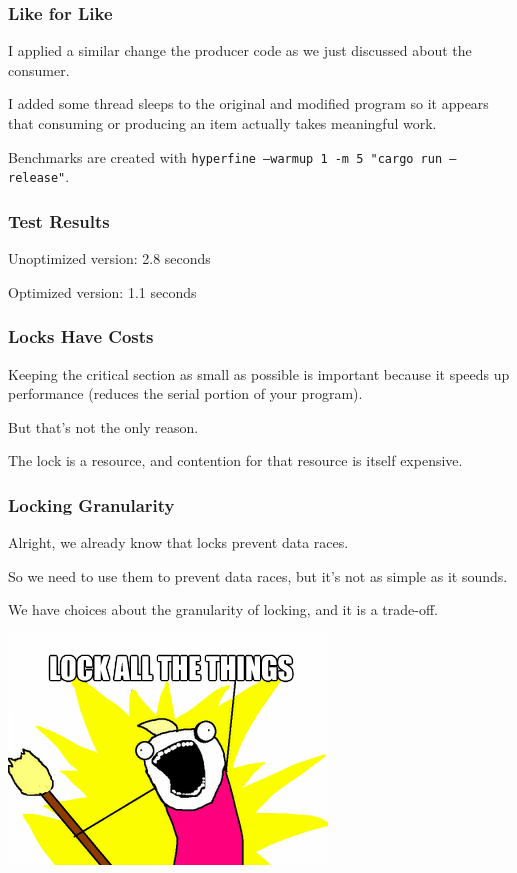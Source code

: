 \begin{frame}
\frametitle{Like for Like}
I applied a similar change the producer code as we just discussed about the consumer. 
 
I added some thread sleeps to the original and modified program so it appears that consuming or producing an item actually takes meaningful work. 

Benchmarks are created with \texttt{hyperfine --warmup 1 -m 5 "cargo run --release"}.
 

\end{frame}


\begin{frame}
\frametitle{Test Results}

Unoptimized version: 2.8 seconds


Optimized version: 1.1 seconds


\end{frame}




\begin{frame}
\frametitle{Locks Have Costs}

Keeping the critical section as small as possible is important because it speeds up performance (reduces the serial portion of your program). 

But that's not the only reason. 

The lock is a resource, and contention for that resource is itself expensive.


\end{frame}


\begin{frame}
\frametitle{Locking Granularity}
Alright, we already know that locks prevent data races.

So we need to use them to prevent data races, but it's not as simple as it sounds. 

We have choices about the granularity of locking, and it is a trade-off.


  \begin{center}
    \includegraphics[scale=0.5]{images/lock-all-the-things}
  \end{center}
\end{frame}


